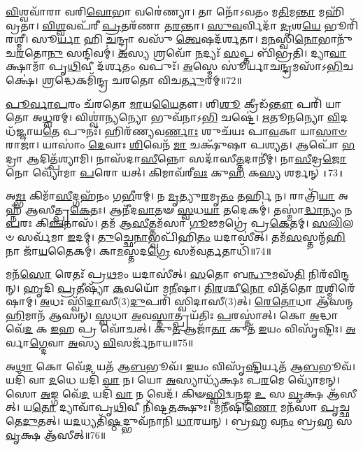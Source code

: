 \-\ul{𑌵𑌿}\-𑌶𑍍𑌵𑌵𑌾᳴𑌰𑌾 𑌵𑌰𑌿\-\ul{𑌵𑍋}\-𑌭𑌾 𑌵𑌰𑍇॑𑌣𑍍𑌯𑌾।
𑌤𑌾 𑌨𑍋᳴𑌽𑌵𑌤𑌂 𑌮\-\ul{𑌤𑌿}\-𑌮\-\ul{𑌨𑍍𑌤𑌾} 𑌮𑌹𑌿᳴𑌵𑍍𑌰𑌤𑌾।
\-\ul{𑌵𑌿}\-\-\ul{𑌶𑍍𑌵}\-𑌵𑌪᳴𑌰𑍀 \ul{𑌪𑍍𑌰}\-𑌤𑌰᳴𑌣𑌾 𑌤\-\ul{𑌰}\-𑌨𑍍𑌤𑌾।
\-\ul{𑌸𑍁}\-\-\ul{𑌵}\-𑌰𑍍𑌵𑌿𑌦𑌾᳴ \ul{𑌦𑍃}\-𑌶\-\ul{𑌯𑍇} 𑌭𑍂𑌰𑌿᳴𑌰𑌶𑍍𑌮𑍀।
𑌸𑍂\-\ul{𑌰𑍍𑌯𑌾} 𑌹𑌿 \ul{𑌚}\-𑌨𑍍𑌦𑍍𑌰𑌾 𑌵𑌸𑍁᳴ \ul{𑌤𑍍𑌵𑍇}\-𑌷𑌦᳴𑌰𑍍\mbox{}𑌶𑌤𑌾।
\-\ul{𑌮}\-\-\ul{𑌨}\-𑌸𑍍𑌵𑌿\-\ul{𑌨𑍋}\-𑌭𑌾𑌨𑍁᳴𑌚\-\ul{𑌰}\-𑌤𑍋\-\ul{𑌨𑍁} 𑌸𑌨𑍍𑌦𑌿𑌵𑌮𑍍॑।
\-\ul{𑌅}\-𑌸𑍍𑌯 𑌶𑍍𑌰𑌵𑍋᳴ \ul{𑌨}\-𑌦𑍍𑌯𑌃᳴ \ul{𑌸}\-𑌪𑍍𑌤 𑌬𑌿᳴𑌭𑍍𑌰𑌤𑌿।
𑌦𑍍𑌯𑌾\-\ul{𑌵𑌾} 𑌕𑍍𑌷𑌾𑌮𑌾᳴ 𑌪𑍃\-\ul{𑌥𑌿}\-𑌵𑍀 𑌦᳴𑌰𑍍\mbox{}\-\ul{𑌶}\-𑌤𑌂 𑌵𑌪𑍁𑌃᳴।
\-\ul{𑌅}\-𑌸𑍍𑌮𑍇 𑌸𑍂॑𑌰𑍍𑌯𑌾𑌚\-\ul{𑌨𑍍𑌦𑍍𑌰}\-𑌮𑌸𑌾᳴\-𑌽\-\ul{𑌭𑌿}\-𑌚𑌕𑍍𑌷𑍇॑।
\-\ul{𑌶𑍍𑌰}\-𑌦𑍍𑌧𑍇𑌕𑌮𑌿᳴𑌨𑍍𑌦𑍍𑌰 𑌚𑌰𑌤𑍋 𑌵𑌿𑌚\-\ul{𑌰𑍍𑌤𑍁}\-𑌰𑌮𑍍॥72॥

\-\ul{𑌪𑍂}\-\-\ul{𑌰𑍍𑌵𑌾}\-\-\ul{𑌪}\-𑌰𑌂 𑌚᳴𑌰𑌤𑍋 \ul{𑌮𑌾}\-𑌯\-\ul{𑌯𑍈}\-𑌤𑍗।
𑌶𑌿\-\ul{𑌶𑍂} 𑌕𑍍𑌰𑍀𑌡᳴\-\ul{𑌨𑍍𑌤𑍗} 𑌪𑌰𑌿᳴ 𑌯𑌾𑌤𑍋 𑌅\-\ul{𑌧𑍍𑌵}\-𑌰𑌮𑍍।
𑌵𑌿𑌶𑍍𑌵𑌾॑\-\ul{𑌨𑍍𑌯}\-𑌨𑍍𑌯𑍋 𑌭𑍁𑌵᳴𑌨𑌾𑌽\-\ul{𑌭𑌿} 𑌚𑌷𑍍𑌟𑍇॑।
\-\ul{𑌋}\-𑌤𑍂\-\ul{𑌨}\-𑌨𑍍𑌯𑍋 \ul{𑌵𑌿}\-𑌦𑌧᳴𑌜𑍍𑌜𑌾𑌯\-\ul{𑌤𑍇} 𑌪𑍁𑌨𑌃᳴।
𑌹𑌿𑌰᳴𑌣𑍍𑌯𑌵\-\ul{𑌰𑍍𑌣𑌾𑌃} 𑌶𑍁𑌚᳴𑌯𑌃 𑌪𑌾\-\ul{𑌵}\-𑌕𑌾 𑌯𑌾\-\ul{𑌸𑌾}\-\-\ul{𑍞} 𑌰𑌾𑌜𑌾॑।
𑌯𑌾𑌸𑌾𑌂॑ \ul{𑌦𑍇}\-𑌵𑌾𑌃 \ul{𑌶𑌿}\-𑌵𑍇𑌨᳴ \ul{𑌮𑌾} 𑌚𑌕𑍍𑌷𑍁᳴𑌷𑌾 𑌪𑌶𑍍𑌯𑌤।
𑌆𑌪𑍋᳴ \ul{𑌭}\-𑌦𑍍𑌰𑌾 𑌆𑌦𑌿𑌤𑍍𑌪᳴𑌶𑍍𑌯𑌾𑌮𑌿।
𑌨𑌾𑌸᳴𑌦𑌾\-\ul{𑌸𑍀}\-𑌨𑍍𑌨𑍋 𑌸𑌦𑌾᳴𑌸𑍀\-\ul{𑌤𑍍𑌤}\-𑌦𑌾𑌨𑍀॑𑌮𑍍।
𑌨𑌾\-\ul{𑌸𑍀}\-𑌦𑍍𑌰\-\ul{𑌜𑍋} 𑌨𑍋 𑌵𑍍𑌯𑍋᳴𑌮𑌾 \ul{𑌪}\-𑌰𑍋 𑌯𑌤𑍍।
𑌕𑌿𑌮𑌾𑌵᳴𑌰𑍀\-\ul{𑌵𑌃} 𑌕𑍁\-\ul{𑌹} 𑌕\-\ul{𑌸𑍍𑌯} 𑌶𑌰𑍍𑌮𑌨𑍍॥73॥

𑌅\-\ul{𑌮𑍍𑌭𑌃} 𑌕𑌿𑌮𑌾᳴\-\ul{𑌸𑍀}\-𑌦𑍍𑌗𑌹᳴𑌨𑌂 𑌗\-\ul{𑌭𑍀}\-𑌰𑌮𑍍।
𑌨 \ul{𑌮𑍃}\-𑌤𑍍𑌯𑍁\-\ul{𑌰}\-𑌮𑍃\-\ul{𑌤𑌂} 𑌤𑌰𑍍\mbox{}\-\ul{𑌹𑌿} 𑌨।
𑌰𑌾𑌤𑍍𑌰𑌿᳴\-\ul{𑌯𑌾} 𑌅𑌹𑍍𑌨᳴ 𑌆𑌸𑍀𑌤𑍍𑌪𑍍𑌰\-\ul{𑌕𑍇}\-𑌤𑌃।
𑌆𑌨𑍀᳴𑌦\-\ul{𑌵𑌾}\-𑌤𑍟 \ul{𑌸𑍍𑌵}\-𑌧\-\ul{𑌯𑌾} 𑌤𑌦𑍇𑌕𑌮𑍍॑।
𑌤𑌸𑍍𑌮𑌾॑\-\ul{𑌦𑍍𑌧𑌾}\-𑌨𑍍𑌯𑌂 𑌨 \ul{𑌪}\-𑌰𑌃 𑌕𑌿\-\ul{𑌞𑍍𑌚}\-𑌨𑌾𑌸᳴।
𑌤𑌮᳴ 𑌆\-\ul{𑌸𑍀}\-𑌤𑍍𑌤𑌮᳴𑌸𑌾 \ul{𑌗𑍂}\-𑌢𑌮𑌗𑍍𑌰𑍇॑ 𑌪𑍍𑌰\-\ul{𑌕𑍇}\-𑌤𑌮𑍍।
\-\ul{𑌸}\-\-\ul{𑌲𑌿}\-𑌲𑍞 𑌸𑌰𑍍𑌵᳴𑌮𑌾 \ul{𑌇}\-𑌦𑌮𑍍।
\-\ul{𑌤𑍁}\-𑌚𑍍𑌛𑍇\-\ul{𑌨𑌾}\-𑌭𑍍𑌵𑌪𑌿᳴𑌹𑌿\-\ul{𑌤𑌂} 𑌯𑌦𑌾𑌸𑍀॑𑌤𑍍।
𑌤𑌮᳴\-\ul{𑌸}\-𑌸𑍍𑌤𑌨𑍍𑌮᳴\-\ul{𑌹𑌿}\-𑌨𑌾 𑌜𑌾᳴\-\ul{𑌯}\-𑌤𑍈𑌕𑌮𑍍॑।
𑌕𑌾\-\ul{𑌮}\-𑌸𑍍𑌤𑌦\-\ul{𑌗𑍍𑌰𑍇} 𑌸𑌮᳴𑌵\-\ul{𑌰𑍍𑌤}\-𑌤𑌾𑌧𑌿᳴॥74॥

𑌮𑌨᳴\-\ul{𑌸𑍋} 𑌰𑍇𑌤𑌃᳴ 𑌪𑍍𑌰\-\ul{𑌥}\-𑌮𑌂 𑌯𑌦𑌾𑌸𑍀॑𑌤𑍍।
\-\ul{𑌸}\-𑌤𑍋 𑌬\-\ul{𑌨𑍍𑌧𑍁}\-𑌮𑌸᳴\-\ul{𑌤𑌿} 𑌨𑌿𑌰᳴𑌵𑌿𑌨𑍍𑌦𑌨𑍍।
\-\ul{𑌹𑍃}\-𑌦𑌿 \ul{𑌪𑍍𑌰}\-𑌤𑍀𑌷𑍍𑌯𑌾᳴ \ul{𑌕}\-𑌵𑌯𑍋᳴ 𑌮\-\ul{𑌨𑍀}\-𑌷𑌾।
\-\ul{𑌤𑌿}\-\-\ul{𑌰}\-𑌶𑍍𑌚𑍀\-\ul{𑌨𑍋} 𑌵𑌿𑌤᳴𑌤𑍋 \ul{𑌰}\-𑌶𑍍𑌮𑌿𑌰𑍇᳴𑌷𑌾𑌮𑍍।
\-\ul{𑌅}\-𑌧𑌃 𑌸𑍍𑌵𑌿᳴\-\ul{𑌦𑌾}\-𑌸𑍀(3)\-\ul{𑌦𑍁}\-𑌪𑌰𑌿᳴ 𑌸𑍍𑌵𑌿𑌦𑌾𑌸𑍀(3)𑌤𑍍।
\-\ul{𑌰𑍇}\-\-\ul{𑌤𑍋}\-𑌧𑌾 𑌆᳴𑌸𑌨𑍍𑌮\-\ul{𑌹𑌿}\-𑌮𑌾𑌨᳴ 𑌆𑌸𑌨𑍍।
\-\ul{𑌸𑍍𑌵}\-𑌧𑌾 \ul{𑌅}\-𑌵\-\ul{𑌸𑍍𑌤𑌾}\-𑌤𑍍𑌪𑍍𑌰𑌯᳴𑌤𑌿𑌃 \ul{𑌪}\-𑌰𑌸𑍍𑌤𑌾॑𑌤𑍍।
𑌕𑍋 \ul{𑌅}\-𑌦𑍍𑌧𑌾 𑌵𑍇᳴\-\ul{𑌦} 𑌕 \ul{𑌇}\-𑌹 𑌪𑍍𑌰 𑌵𑍋᳴𑌚𑌤𑍍।
𑌕𑍁\-\ul{𑌤} 𑌆𑌜𑌾᳴\-\ul{𑌤𑌾} 𑌕𑍁𑌤᳴ \ul{𑌇}\-𑌯𑌂 𑌵𑌿𑌸𑍃᳴𑌷𑍍𑌟𑌿𑌃।
\-\ul{𑌅}\-𑌰𑍍𑌵𑌾\-\ul{𑌗𑍍𑌦𑍇}\-𑌵𑌾 \ul{𑌅}\-𑌸𑍍𑌯 \ul{𑌵𑌿}\-𑌸𑌰𑍍𑌜᳴𑌨𑌾𑌯॥75॥

𑌅\-\ul{𑌥𑌾} 𑌕𑍋 𑌵𑍇᳴\-\ul{𑌦} 𑌯𑌤᳴ 𑌆\-\ul{𑌬}\-𑌭𑍂𑌵᳴।
\-\ul{𑌇}\-𑌯𑌂 𑌵𑌿𑌸𑍃᳴\-\ul{𑌷𑍍𑌟𑌿}\-𑌰𑍍𑌯𑌤᳴ 𑌆\-\ul{𑌬}\-𑌭𑍂𑌵᳴।
𑌯𑌦𑌿᳴ 𑌵𑌾 \ul{𑌦}\-𑌧𑍇 𑌯𑌦𑌿᳴ \ul{𑌵𑌾} 𑌨।
𑌯𑍋 \ul{𑌅}\-𑌸𑍍𑌯𑌾𑌧𑍍𑌯᳴𑌕𑍍𑌷𑌃 𑌪\-\ul{𑌰}\-𑌮𑍇 𑌵𑍍𑌯𑍋᳴𑌮𑌨𑍍।
𑌸𑍋 \ul{𑌅}\-𑌙𑍍𑌗 𑌵𑍇᳴\-\ul{𑌦} 𑌯𑌦𑌿᳴ \ul{𑌵𑌾} 𑌨 𑌵𑍇𑌦᳴।
𑌕𑌿𑍟\-\ul{𑌸𑍍𑌵𑌿}\-𑌦𑍍𑌵\-\ul{𑌨}\-𑌙𑍍𑌕 \ul{𑌉} 𑌸 \ul{𑌵𑍃}\-𑌕𑍍𑌷 𑌆᳴𑌸𑍀𑌤𑍍।
𑌯\-\ul{𑌤𑍋} 𑌦𑍍𑌯𑌾𑌵𑌾᳴𑌪𑍃\-\ul{𑌥𑌿}\-𑌵𑍀 𑌨𑌿᳴𑌷𑍍𑌟\-\ul{𑌤}\-𑌕𑍍𑌷𑍁𑌃।
𑌮𑌨𑍀᳴𑌷𑌿\-\ul{𑌣𑍋} 𑌮𑌨᳴𑌸𑌾 \ul{𑌪𑍃}\-𑌚𑍍𑌛𑌤𑍇\-\ul{𑌦𑍁}\-𑌤𑌤𑍍।
𑌯\-\ul{𑌦}\-𑌧𑍍𑌯𑌤𑌿᳴\-\ul{𑌷𑍍𑌠}\-𑌦𑍍𑌭𑍁𑌵᳴𑌨𑌾𑌨𑌿 \ul{𑌧𑌾}\-𑌰𑌯𑌨𑍍।
𑌬𑍍𑌰\-\ul{𑌹𑍍𑌮} 𑌵\-\ul{𑌨𑌂} 𑌬𑍍𑌰\-\ul{𑌹𑍍𑌮} 𑌸 \ul{𑌵𑍃}\-𑌕𑍍𑌷 𑌆᳴𑌸𑍀𑌤𑍍॥76॥

